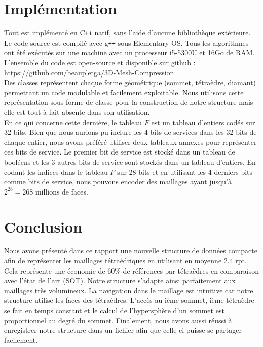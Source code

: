 \documentclass[a4paper,11pt,openany]{article}
\begin{document}
\section{Implémentation}
\noindent
Tout est implémenté en C\texttt{++} natif, sans l'aide d'aucune bibliothèque extérieure. Le code source est compilé avec g\texttt{++} sous Elementary OS. Tous les algorithmes ont été exécutés sur une machine avec un processeur i5-5300U et 16Go de RAM. L'ensemble du code est open-source et disponible sur github : \url{https://github.com/beaupletga/3D-Mesh-Compression}.\\
Des classes représentent chaque forme géométrique (sommet, tétraèdre, diamant) permettant un code modulable et facilement exploitable. Nous utilisons cette représentation sous forme de classe pour la construction de notre structure mais elle est tout à fait absente dans son utilisation. \\
En ce qui concerne cette dernière, le tableau $F$ est un tableau d'entiers codés sur 32 bits. Bien que nous aurions pu inclure les 4 bits de services dans les 32 bits de chaque entier, nous avons préféré utiliser deux tableaux annexes pour représenter ces bits de service. Le premier bit de service est stocké dans un tableau de booléens et les 3 autres bits de service sont stockés dans un tableau d'entiers. En codant les indices dans le tableau $F$ sur 28 bits et en utilisant les 4 derniers bits comme bits de service, nous pouvons encoder des maillages ayant jusqu'à $2^{28}=268$ millions de faces.

\section{Conclusion}
\noindent
Nous avons présenté dans ce rapport une nouvelle structure de données compacte afin de représenter les maillages tétraèdriques en utilisant en moyenne 2.4 rpt. Cela représente une économie de 60\% de références par tétraèdres en comparaison avec l'état de l'art (SOT). Notre structure s'adapte ainsi parfaitement aux maillages très volumineux. La navigation dans le maillage est intuitive car notre structure utilise les faces des tétraèdres. L'accès au ième sommet, ième tétraèdre se fait en temps constant et le calcul de l'hypersphère d'un sommet est proportionnel au degré du sommet. Finalement, nous avons aussi réussi à enregistrer notre structure dans un fichier afin que celle-ci puisse se partager facilement.
\end{document}
